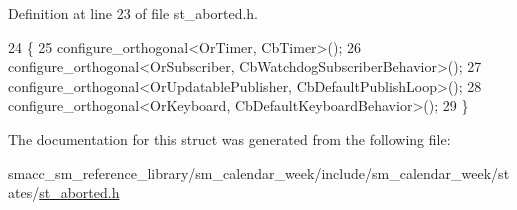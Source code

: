 Definition at line 23 of file st\+\_\+aborted.\+h.


\begin{DoxyCode}
24     \{
25         configure\_orthogonal<OrTimer, CbTimer>();   
26         configure\_orthogonal<OrSubscriber, CbWatchdogSubscriberBehavior>();
27         configure\_orthogonal<OrUpdatablePublisher, CbDefaultPublishLoop>();
28         configure\_orthogonal<OrKeyboard, CbDefaultKeyboardBehavior>();
29     \}
\end{DoxyCode}


The documentation for this struct was generated from the following file\+:\begin{DoxyCompactItemize}
\item 
smacc\+\_\+sm\+\_\+reference\+\_\+library/sm\+\_\+calendar\+\_\+week/include/sm\+\_\+calendar\+\_\+week/states/\hyperlink{sm__calendar__week_2include_2sm__calendar__week_2states_2st__aborted_8h}{st\+\_\+aborted.\+h}\end{DoxyCompactItemize}
